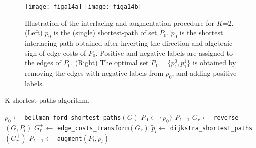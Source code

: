 \begin{figure}[t]
\centering
\texttt{[image: figa14a]}
\texttt{[image: figa14b]}
\caption{Illustration of the interlacing and augmentation procedure for $K$=2. (Left) $p_0$ is the (single) shortest-path of set $P_0$. $\tilde{p}_0$ is the shortest interlacing path obtained after inverting the direction and algebraic sign of edge costs of $P_0$. Positive and negative labels are assigned to the edges of $P_0$. (Right) The optimal set $P_1=\{ p_1^0,p_1^1 \}$ is obtained by removing the edges with negative labels from $p_0$, and adding positive labels.}\label{fig:augment}
\end{figure}


\begin{algorithm}[t]
\caption{K-shortest paths algorithm.\label{alg:ksp}}
\begin{algorithmic}[1]
\State $p_0 \gets$ \texttt{bellman\_ford\_shortest\_paths}$(G)$
\State $P_0 \gets\{p_0\} $
     \Return $P_{l-1}$
 \EndIf
 \EndIf
   \State $G_r \gets$ \texttt{reverse}$(G,P_l)$
   \State $G_r^+ \gets$ \texttt{edge\_costs\_transform}$(G_r)$
   \State $\tilde{p}_l \gets$ \texttt{dijkstra\_shortest\_paths}$(G_r^+)$
   \State $P_{l+1} \gets$ \texttt{augment}$(P_l, \tilde{p}_l)$
\EndFor

\end{algorithmic}
\end{algorithm}

